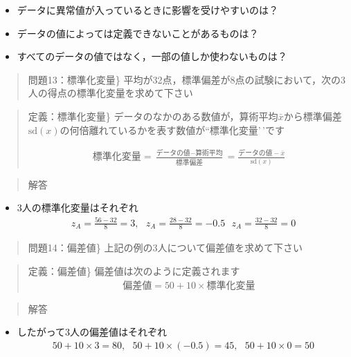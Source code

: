 \documentclass[
]{book}
\providecommand{\tightlist}{%
  \setlength{\itemsep}{0pt}\setlength{\parskip}{0pt}}
\theoremstyle{definition}
\theoremstyle{definition}
\theoremstyle{definition}
\theoremstyle{definition}
\theoremstyle{remark}
\begin{document}
\begin{itemize}
\tightlist
\item
  データに異常値が入っているときに影響を受けやすいのは？
\item
  データの値によっては定義できないことがあるものは？
\item
  すべてのデータの値ではなく，一部の値しか使わないものは？
\end{itemize}

\begin{quote}
問題13：標準化変量\}
平均が32点，標準偏差が8点の試験において，次の3人の得点の標準化変量を求めて下さい
\end{quote}

\begin{quote}
定義：標準化変量\}
データのなかのある数値が，算術平均\(\bar{x}\)から標準偏差\(\text{sd}(x)\)の何倍離れているかを表す数値が``標準化変量'\,'です

\begin{align*}
\text{標準化変量}
=\frac{\text{データの値}-\text{算術平均}}{\text{標準偏差}}
=\frac{\text{データの値}-\bar{x}}{\text{sd}(x)}
\end{align*}
\end{quote}

\begin{quote}
解答
\end{quote}

\begin{itemize}
\tightlist
\item
  3人の標準化変量はそれぞれ
  \begin{align*}
  z_A=\frac{56-32}{8}=3,~~~
  z_A=\frac{28-32}{8}=-0.5~~~
  z_A=\frac{32-32}{8}=0
  \end{align*}
\end{itemize}

\begin{quote}
問題14：偏差値\}
上記の例の3人について偏差値を求めて下さい
\end{quote}

\begin{quote}
定義：偏差値\}
偏差値は次のように定義されます
\begin{align*}
\text{偏差値}=50+10 \times \text{標準化変量}
\end{align*}
\end{quote}

\begin{quote}
解答
\end{quote}

\begin{itemize}
\tightlist
\item
  したがって3人の偏差値はそれぞれ
  \begin{align*}
  50+10 \times 3=80,~~~
  50+10 \times (-0.5)=45,~~~ 
  50+10 \times 0=50
  \end{align*}
\end{itemize}
\end{document}
